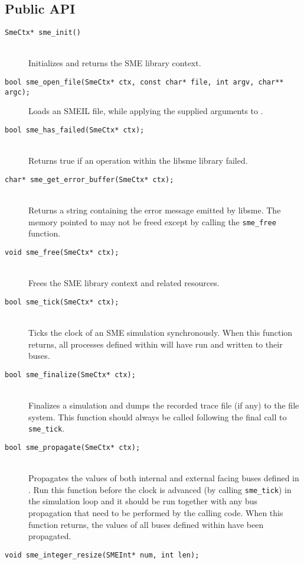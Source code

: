 \subsection{Public API}
\begin{description}
\item[\texttt{SmeCtx* sme\_init()}]\hfill\\
   Initializes and returns the SME library context.
 \item[\texttt{bool sme_open_file(SmeCtx* ctx, const char* file, int argv,
     char** argc);}]\hfill Loads an SMEIL file, while applying the supplied
   arguments to \libsme{}.
   \item[\texttt{bool sme_has_failed(SmeCtx* ctx);}]\hfill\\
     Returns true if an operation within the libsme library failed.
 \item[\texttt{char* sme_get_error_buffer(SmeCtx* ctx);}]\hfill\\
   Returns a string containing the error message emitted by libsme. The memory
   pointed to may not be freed except by calling the \texttt{sme_free} function.
 \item[\texttt{void sme_free(SmeCtx* ctx);}]\hfill\\
   Frees the SME library context and related resources.
 \item[\texttt{bool sme_tick(SmeCtx* ctx);}]\hfill\\
   Ticks the clock of an SME simulation synchronously. When this function
   returns, all processes defined within \libsme{} will have run and written to
   their buses.
 \item[\texttt{bool sme_finalize(SmeCtx* ctx);}]\hfill\\
   Finalizes a simulation and dumps the recorded trace file (if any) to the file
   system. This function should always be called following the final call to
   \texttt{sme_tick}.
 \item[\texttt{bool sme_propagate(SmeCtx* ctx);}]\hfill\\
   Propagates the values of both internal and external facing buses defined in
   \libsme{}. Run this function before the clock is advanced (by calling
   \texttt{sme_tick}) in the simulation loop and it should be run together with
   any bus propagation that need to be performed by the calling code. When this
   function returns, the values of all buses defined within \libsme{} have been
   propagated.
 \item[\texttt{void sme_integer_resize(SMEInt* num, int len);}]\hfill\\

\end{description}
